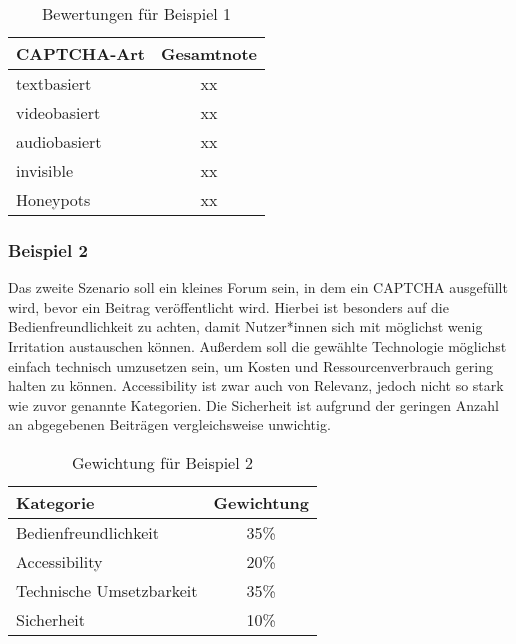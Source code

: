 \begin{table}[h!]
    \caption{Bewertungen für Beispiel 1}
    \begin{center}
        \begin{tabular}{l|c}
            CAPTCHA-Art                       & Gesamtnote \\\hline
            textbasiert            & xx        \\
            videobasiert                   & xx       \\
            audiobasiert        & xx         \\
            invisible                      & xx         \\
            Honeypots & xx

        \end{tabular}
    \end{center}
\end{table}

\subsubsection*{Beispiel 2}
Das zweite Szenario soll ein kleines Forum sein, in dem ein CAPTCHA ausgefüllt wird, bevor ein Beitrag veröffentlicht wird.
Hierbei ist besonders auf die Bedienfreundlichkeit zu achten, damit Nutzer*innen sich mit möglichst wenig Irritation austauschen können.
Außerdem soll die gewählte Technologie möglichst einfach technisch umzusetzen sein, um Kosten und Ressourcenverbrauch gering halten zu können.
Accessibility ist zwar auch von Relevanz, jedoch nicht so stark wie zuvor genannte Kategorien.
Die Sicherheit ist aufgrund der geringen Anzahl an abgegebenen Beiträgen vergleichsweise unwichtig.

\begin{table}[h!]
    \caption{Gewichtung für Beispiel 2}
    \begin{center}
        \begin{tabular}{l|c}
            Kategorie                       & Gewichtung \\\hline
            Bedienfreundlichkeit            & 35\%         \\
            Accessibility                   & 20\%        \\
            Technische Umsetzbarkeit        & 35\%         \\
            Sicherheit                      & 10\%         
        \end{tabular}
    \end{center}
\end{table}

